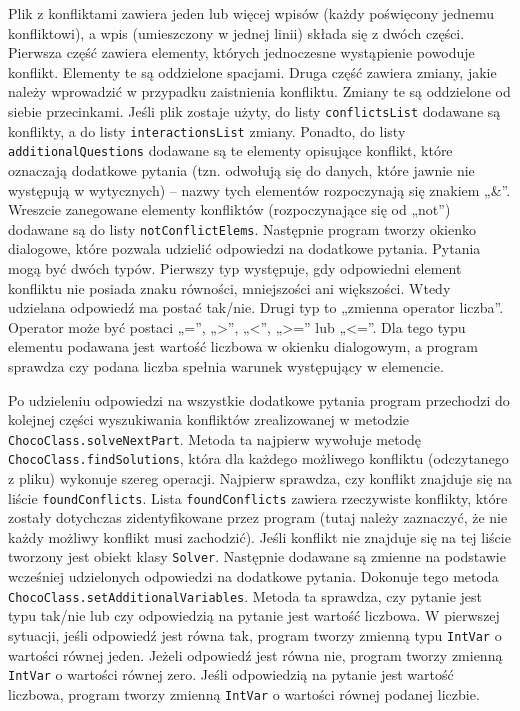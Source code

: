 Plik z konfliktami zawiera jeden lub więcej wpisów (każdy poświęcony jednemu konfliktowi), a wpis (umieszczony w jednej linii) składa się z dwóch części. Pierwsza część zawiera elementy, których jednoczesne wystąpienie powoduje konflikt. Elementy te są oddzielone spacjami. Druga część zawiera zmiany, jakie należy wprowadzić w przypadku zaistnienia konfliktu. Zmiany te są oddzielone od siebie przecinkami. Jeśli plik zostaje użyty, do listy \texttt{conflictsList} dodawane są konflikty, a do listy \texttt{interactionsList} zmiany. Ponadto, do listy \texttt{additionalQuestions} dodawane są te elementy opisujące konflikt, które oznaczają dodatkowe pytania (tzn. odwołują się do danych, które jawnie nie występują w wytycznych) -- nazwy tych elementów rozpoczynają się znakiem „\&”. Wreszcie zanegowane elementy konfliktów (rozpoczynające się od „not”) dodawane są do listy \texttt{notConflictElems}. Następnie program tworzy okienko dialogowe, które pozwala udzielić odpowiedzi na dodatkowe pytania. Pytania mogą być dwóch typów. Pierwszy typ występuje, gdy odpowiedni element konfliktu nie posiada znaku równości, mniejszości ani większości. Wtedy udzielana odpowiedź ma postać tak/nie. Drugi typ to „zmienna operator liczba”. Operator może być postaci „=”, „>”, „<”, „>=” lub „<=”. Dla tego typu elementu podawana jest wartość liczbowa w okienku dialogowym, a program sprawdza czy podana liczba spełnia warunek występujący w elemencie. 

Po udzieleniu odpowiedzi na wszystkie dodatkowe pytania program przechodzi do kolejnej części wyszukiwania konfliktów zrealizowanej w metodzie \texttt{ChocoClass.solveNextPart}. Metoda ta najpierw wywołuje metodę \texttt{ChocoClass.findSolutions}, która dla każdego możliwego konfliktu (odczytanego z pliku) wykonuje szereg operacji. Najpierw sprawdza, czy konflikt znajduje się na liście \texttt{foundConflicts}. Lista \texttt{foundConflicts} zawiera rzeczywiste konflikty, które zostały dotychczas zidentyfikowane przez program (tutaj należy zaznaczyć, że nie każdy możliwy konflikt musi zachodzić). Jeśli konflikt nie znajduje się na tej liście tworzony jest obiekt klasy \texttt{Solver}. Następnie dodawane są zmienne na podstawie wcześniej udzielonych odpowiedzi na dodatkowe pytania. Dokonuje tego metoda \texttt{ChocoClass.setAdditionalVariables}. Metoda ta sprawdza, czy pytanie jest typu tak/nie lub czy odpowiedzią na pytanie jest wartość liczbowa. W pierwszej sytuacji, jeśli odpowiedź jest równa tak, program tworzy zmienną typu \texttt{IntVar} o wartości równej jeden. Jeżeli odpowiedź jest równa nie, program tworzy zmienną \texttt{IntVar} o wartości równej zero. Jeśli odpowiedzią na pytanie jest wartość liczbowa, program tworzy zmienną \texttt{IntVar} o wartości równej podanej liczbie. 

